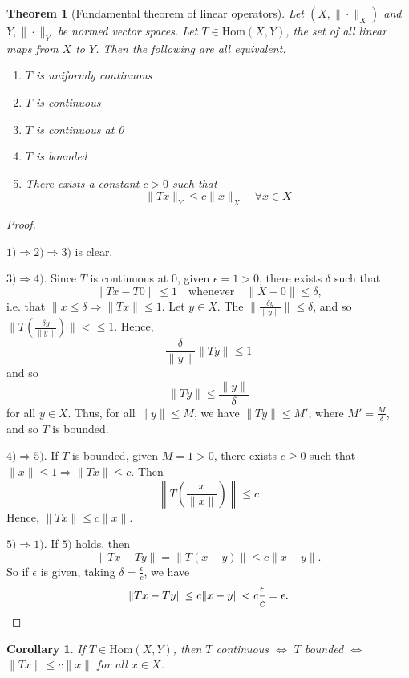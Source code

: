 \documentclass[justified]{tufte-book}
\theoremstyle{plain}%
\newtheorem{thm}{Theorem}[chapter]
\newtheorem*{cor}{Corollary}
\theoremstyle{definition}
\theoremstyle{remark}
\begin{document}
\begin{thm}[Fundamental theorem of linear operators]
  Let $( X, \| \cdot \|_X)$ and $Y, \| \cdot \|_Y$ be normed vector spaces.  Let $ T \in \text{Hom}(X,Y)$, the set of all linear maps from $X$ to $Y$.  Then the following are all equivalent.
  \begin{enumerate}[1)]
      \item $T$ is uniformly continuous
      \item $T$ is continuous
      \item $T$ is continuous at 0
      \item $T$ is bounded
      \item There exists a constant $c > 0$ such that \[
          \| Tx \|_Y \leq c \| x \|_X \quad \forall x \in X
      \]
  \end{enumerate}
\end{thm}

\begin{proof}{\ }
    
  $1) \Rightarrow 2) \Rightarrow 3)$ is clear.
  
  $3) \Rightarrow 4)$.  Since $T$ is continuous at $0$, given $\epsilon = 1 > 0$, there exists $\delta$ such that \[
      \| Tx - T0 \| \leq 1 \quad \text{whenever} \quad \| X - 0 \| \leq \delta,
  \] i.e. that $\| x \leq \delta \Rightarrow \| Tx \| \leq 1$.  Let $y \in X$.  The $\| \frac{\delta y}{\| y \|} \| \leq \delta$, and so $\| T\left( \frac{\delta y}{\| y \|} \right) \| < \leq 1$.  Hence, \[
      \frac{\delta}{\|y \|} \|T y \| \leq 1
  \] and so \[
      \|Ty \| \leq \frac{ \| y \|}{\delta}
  \] for all $y \in X$.  Thus, for all $\| y \| \leq M$, we have $\| Ty \| \leq M'$, where $M' = \frac{M}{\delta}$, and so $T$ is bounded. 
  
  $4) \Rightarrow 5)$.  If $T$ is bounded, given $M = 1 > 0$, there exists $c \geq 0$ such that $\| x \| \leq 1 \Rightarrow \|T x \| \leq c$.  Then \[
       \left\|T \left( \frac{x}{\|x \|} \right) \right\| \leq c  \] 
      Hence, $\|Tx \| \leq c \| x \|$.  
      
  $5) \Rightarrow 1)$.  If $5)$ holds, then  \[
      \| Tx - Ty \| = \| T(x-y) \| \leq c \| x - y \|.
  \]  So if $\epsilon$ is given, taking $\delta = \frac{\epsilon}{c}$, we have \[
      \|Tx - Ty \| \leq c \| x - y \| < c \frac{\epsilon}{c} = \epsilon. \qedhere
  \]
\end{proof}

\begin{cor}
  If $T \in \text{Hom}(X,Y)$, then $T$ continuous $\iff$ $T$ bounded $\iff$ $\|Tx \| \leq c \| x \|$ for all $x \in X$.
\end{cor}
\end{document}
